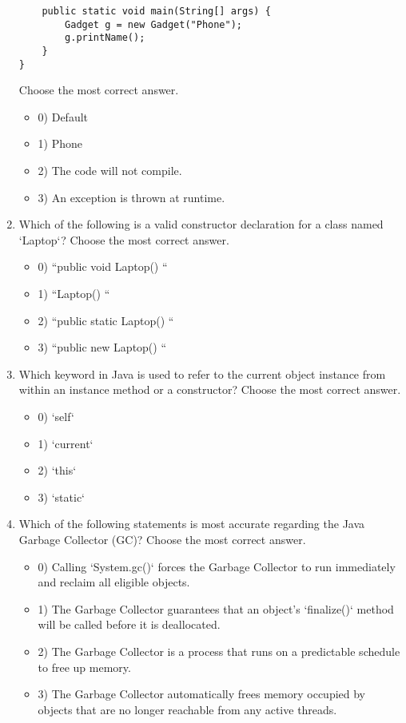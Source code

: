 \documentclass[12pt]{article}
\begin{document}
\begin{enumerate}[label=(\arabic*)]
\begin{verbatim}
    public static void main(String[] args) {
        Gadget g = new Gadget("Phone");
        g.printName();
    }
}
\end{verbatim}
Choose the most correct answer. 
\begin{itemize}
\item 0) Default
\item 1) Phone
\item 2) The code will not compile.
\item 3) An exception is thrown at runtime.
\end{itemize}
\item Which of the following is a valid constructor declaration for a class named `Laptop`?
Choose the most correct answer. 
\begin{itemize}
\item 0) ``public void Laptop() { }``
\item 1) ``Laptop() { }``
\item 2) ``public static Laptop() { }``
\item 3) ``public new Laptop() { }``
\end{itemize}
\item Which keyword in Java is used to refer to the current object instance from within an instance method or a constructor?
Choose the most correct answer. 
\begin{itemize}
\item 0) `self`
\item 1) `current`
\item 2) `this`
\item 3) `static`
\end{itemize}
\item Which of the following statements is most accurate regarding the Java Garbage Collector (GC)?
Choose the most correct answer. 
\begin{itemize}
\item 0) Calling `System.gc()` forces the Garbage Collector to run immediately and reclaim all eligible objects.
\item 1) The Garbage Collector guarantees that an object's `finalize()` method will be called before it is deallocated.
\item 2) The Garbage Collector is a process that runs on a predictable schedule to free up memory.
\item 3) The Garbage Collector automatically frees memory occupied by objects that are no longer reachable from any active threads.
\end{itemize}

\end{enumerate}
\end{document}

